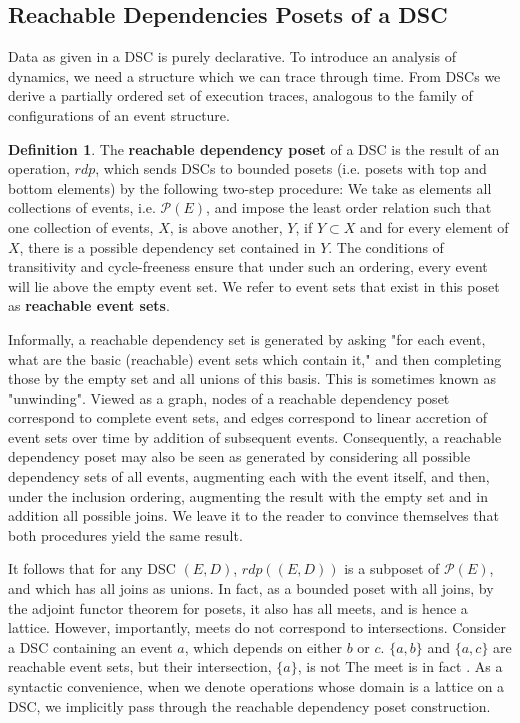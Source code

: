 \documentclass[hoptionsi,review,format=acmsmall]{acmart}
\theoremstyle{definition}
\newtheorem{definition}{Definition}[section]
\newcommand{\Pc}{\mathcal{P}}
\begin{document}
\subsection{Reachable Dependencies Posets of a DSC}

Data as given in a DSC is purely declarative. To introduce an analysis of dynamics, we need a structure which we can trace through time. From DSCs we derive a partially ordered set of execution traces, analogous to the family of configurations of an event structure.

\begin{definition} The \textbf{reachable dependency poset} of a DSC is the result of an operation, \(rdp\), which sends DSCs to bounded posets (i.e. posets with top and bottom elements) by the following two-step procedure:  We take as elements all collections of events, i.e. \(\Pc(E)\), and impose the least order relation such that one collection of events, \(X\), is above another, \(Y\), if \(Y \subset X\) and for every element of \(X\), there is a possible dependency set contained in \(Y\).  The conditions of transitivity and cycle-freeness ensure that under such an ordering, every event will lie above the empty event set. We refer to event sets that exist in this poset as \textbf{reachable event sets}.
\end{definition}

Informally, a reachable dependency set is generated by asking "for each event, what are the basic (reachable) event sets which contain it," and then completing those by the empty set and all unions of this basis. This is sometimes known as "unwinding". Viewed as a graph, nodes of a reachable dependency poset correspond to complete event sets, and edges correspond to linear accretion of event sets over time by addition of subsequent events. Consequently, a reachable dependency poset may also be seen as generated by considering all possible dependency sets of all events, augmenting each with the event itself, and then, under the inclusion ordering, augmenting the result with the empty set and in addition all possible joins. We leave it to the reader to convince themselves that both procedures yield the same result.

It follows that for any DSC \((E,D)\), \(rdp((E,D))\)  is a subposet of \(\Pc(E)\), and which has all joins as unions. In fact, as a bounded poset with all joins, by the adjoint functor theorem for posets, it also has all  meets, and is hence a lattice.
However, importantly, meets do not correspond to intersections. Consider a DSC containing an event \(a\), which depends on either \(b\) or \(c\). \(\{a,b\}\) and  \(\{a,c\}\) are reachable event sets, but their intersection, \(\{a\}\), is not The meet is in fact \({}\). As a syntactic convenience, when we denote operations whose domain is a lattice on a DSC, we implicitly pass through the reachable dependency poset construction.
\end{document}
